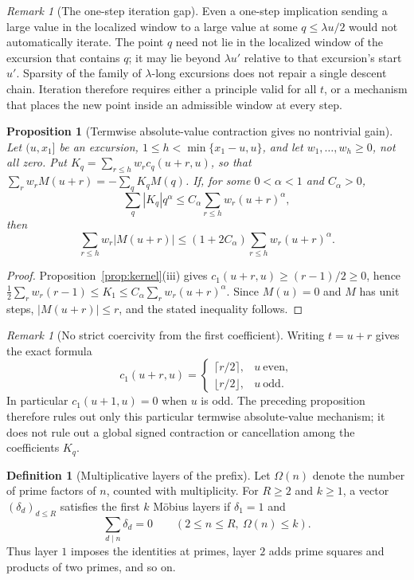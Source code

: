 \documentclass[11pt]{amsart}
\numberwithin{equation}{section}
\theoremstyle{plain}
\newtheorem{proposition}[theorem]{Proposition}
\theoremstyle{definition}
\newtheorem{definition}[theorem]{Definition}
\theoremstyle{remark}
\newtheorem{remark}[theorem]{Remark}
\begin{document}
\begin{remark}[The one-step iteration gap]
\label{rem:iteration-gap}
Even a one-step implication sending a large value in the localized window
to a large value at some $q\le\lambda u/2$ would not automatically iterate.
The point $q$ need not lie in the localized window of the excursion that
contains $q$; it may lie beyond $\lambda u'$ relative to that excursion's
start $u'$.  Sparsity of the family of $\lambda$-long excursions does not
repair a single descent chain.  Iteration therefore requires either a
principle valid for all $t$, or a mechanism that places the new point inside
an admissible window at every step.
\end{remark}

\begin{proposition}[Termwise absolute-value contraction gives no nontrivial gain]
\label{prop:cone-obstruction}
Let $(u,x_1]$ be an excursion, $1\le h<\min\{x_1-u,u\}$, and let
$w_1,\dots,w_h\ge0$, not all zero. Put
$K_q=\sum_{r\le h}w_rc_q(u+r,u)$, so that
$\sum_rw_rM(u+r)=-\sum_qK_qM(q)$. If, for some $0<\alpha<1$ and
$C_\alpha>0$,
\[
\sum_q|K_q|q^\alpha\le C_\alpha\sum_{r\le h}w_r(u+r)^\alpha,
\]
then
\[
\sum_{r\le h}w_r|M(u+r)|
\le(1+2C_\alpha)\sum_{r\le h}w_r(u+r)^\alpha.
\]
\end{proposition}

\begin{proof}
Proposition~\ref{prop:kernel}(iii) gives
$c_1(u+r,u)\ge(r-1)/2\ge0$, hence
$\frac12\sum_rw_r(r-1)\le K_1\le
C_\alpha\sum_rw_r(u+r)^\alpha$. Since $M(u)=0$ and $M$ has unit steps,
$|M(u+r)|\le r$, and the stated inequality follows.
\end{proof}

\begin{remark}[No strict coercivity from the first coefficient]
\label{rem:c1-parity}
Writing $t=u+r$ gives the exact formula
\[
c_1(u+r,u)=
\begin{cases}
\lceil r/2\rceil,&u\ \text{even},\\
\lfloor r/2\rfloor,&u\ \text{odd}.
\end{cases}
\]
In particular $c_1(u+1,u)=0$ when $u$ is odd.  The preceding proposition
therefore rules out only this particular termwise absolute-value mechanism;
it does not rule out a global signed contraction or cancellation among the
coefficients $K_q$.
\end{remark}

\begin{definition}[Multiplicative layers of the prefix]
\label{def:multiplicative-layers}
Let $\Omega(n)$ denote the number of prime factors of $n$, counted with
multiplicity.  For $R\ge2$ and $k\ge1$, a vector
$(\delta_d)_{d\le R}$ satisfies the first $k$ M\"obius layers if
$\delta_1=1$ and
\[
\sum_{d\mid n}\delta_d=0
\qquad(2\le n\le R,\ \Omega(n)\le k).
\]
Thus layer $1$ imposes the identities at primes, layer $2$ adds prime
squares and products of two primes, and so on.
\end{definition}
\end{document}
